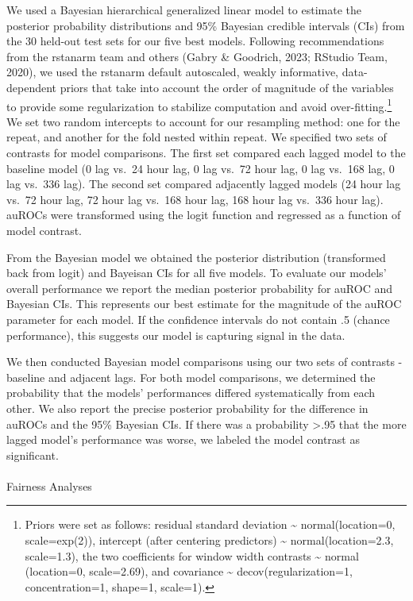 \documentclass[
]{agujournal2019}
\makeatletter
\let\oldparagraph\paragraph
\renewcommand{\paragraph}{
    \@ifstar
      \xxxParagraphStar
      \xxxParagraphNoStar
  }
\newcommand{\xxxParagraphStar}[1]{\oldparagraph*{#1}\mbox{}}
\newcommand{\xxxParagraphNoStar}[1]{\oldparagraph{#1}\mbox{}}
\makeatother
\begin{document}
We used a Bayesian hierarchical generalized linear model to estimate the
posterior probability distributions and 95\% Bayesian credible intervals
(CIs) from the 30 held-out test sets for our five best models. Following
recommendations from the rstanarm team and others (Gabry \& Goodrich,
2023; RStudio Team, 2020), we used the rstanarm default autoscaled,
weakly informative, data-dependent priors that take into account the
order of magnitude of the variables to provide some regularization to
stabilize computation and avoid over-fitting.\footnote{Priors were set
  as follows: residual standard deviation \textasciitilde{}
  normal(location=0, scale=exp(2)), intercept (after centering
  predictors) \textasciitilde{} normal(location=2.3, scale=1.3), the two
  coefficients for window width contrasts \textasciitilde{} normal
  (location=0, scale=2.69), and covariance \textasciitilde{}
  decov(regularization=1, concentration=1, shape=1, scale=1).} We set
two random intercepts to account for our resampling method: one for the
repeat, and another for the fold nested within repeat. We specified two
sets of contrasts for model comparisons. The first set compared each
lagged model to the baseline model (0 lag vs.~24 hour lag, 0 lag vs.~72
hour lag, 0 lag vs.~168 lag, 0 lag vs.~336 lag). The second set compared
adjacently lagged models (24 hour lag vs.~72 hour lag, 72 hour lag
vs.~168 hour lag, 168 hour lag vs.~336 hour lag). auROCs were
transformed using the logit function and regressed as a function of
model contrast.

From the Bayesian model we obtained the posterior distribution
(transformed back from logit) and Bayeisan CIs for all five models. To
evaluate our models' overall performance we report the median posterior
probability for auROC and Bayesian CIs. This represents our best
estimate for the magnitude of the auROC parameter for each model. If the
confidence intervals do not contain .5 (chance performance), this
suggests our model is capturing signal in the data.

We then conducted Bayesian model comparisons using our two sets of
contrasts - baseline and adjacent lags. For both model comparisons, we
determined the probability that the models' performances differed
systematically from each other. We also report the precise posterior
probability for the difference in auROCs and the 95\% Bayesian CIs. If
there was a probability \textgreater.95 that the more lagged model's
performance was worse, we labeled the model contrast as significant.

\paragraph{Fairness Analyses}\label{fairness-analyses}
\end{document}
